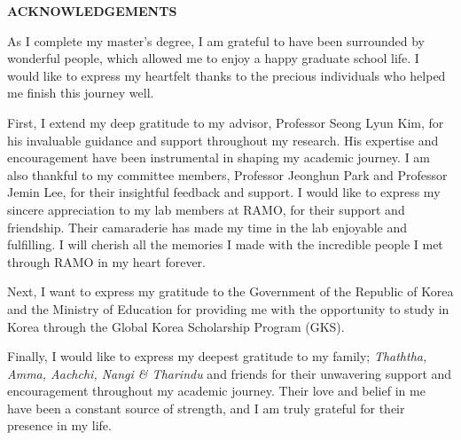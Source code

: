 \clearpage
{}
\begin{centering}
\textbf{ACKNOWLEDGEMENTS}\\
\vspace{\baselineskip}
\end{centering}

As I complete my master’s degree, I am grateful to have been surrounded by wonderful people, which allowed me to enjoy a happy graduate school life. 
I would like to express my heartfelt thanks to the precious individuals who helped me finish this journey well.

First, I extend my deep gratitude to my advisor, Professor Seong Lyun Kim, for his invaluable guidance and support throughout my research. 
His expertise and encouragement have been instrumental in shaping my academic journey. 
I am also thankful to my committee members, Professor Jeonghun Park and Professor Jemin Lee, for their insightful feedback and support.
I would like to express my sincere appreciation to my lab members at RAMO, for their support and friendship. 
Their camaraderie has made my time in the lab enjoyable and fulfilling. I will cherish all the memories I made with the incredible people I met through RAMO in my heart forever.

Next, I want to express my gratitude to the Government of the Republic of Korea and the Ministry of Education for providing me with the opportunity to study in Korea through 
the Global Korea Scholarship Program (GKS).

Finally, I would like to express my deepest gratitude to my family; \textit{ Thaththa, Amma, Aachchi, Nangi \& Tharindu} and friends for their unwavering support and encouragement throughout 
my academic journey. Their love and belief in me have been a constant source of strength, and I am truly grateful for their presence in my life.

\thispagestyle{empty}
\clearpage
